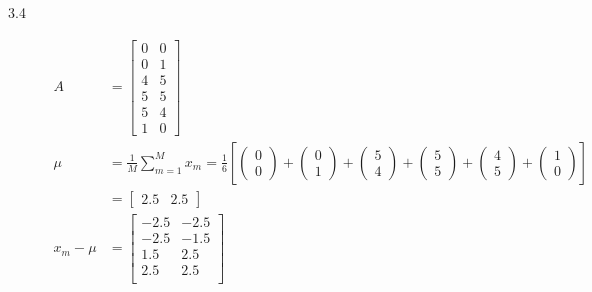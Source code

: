 \documentclass[fleqn]{article}
\begin{document}
\begin{description}
\item [3.4]
    \begin{align*}
        A &= \begin{bmatrix}
                0 & 0 \\
                0 & 1 \\
                4 & 5 \\
                5 & 5 \\
                5 & 4 \\
                1 & 0
             \end{bmatrix} \\
        \mu &= \frac{1}{M} \sum_{m=1}^{M}{x_m} = \frac{1}{6} \left [ \begin{pmatrix}0 \\ 0\end{pmatrix} +
                                                                     \begin{pmatrix}0 \\ 1\end{pmatrix} +
                                                                     \begin{pmatrix}5 \\ 4\end{pmatrix} +
                                                                     \begin{pmatrix}5 \\ 5\end{pmatrix} +
                                                                     \begin{pmatrix}4 \\ 5\end{pmatrix} +
                                                                     \begin{pmatrix}1 \\ 0\end{pmatrix} \right ] \\
            &= \begin{bmatrix} 2.5 & 2.5 \end{bmatrix} \\
        x_m - \mu &= \begin{bmatrix}
                        -2.5 & -2.5 \\
                        -2.5 & -1.5 \\
                         1.5 &  2.5 \\
                         2.5 &  2.5 \\

\end{bmatrix}
\end{align*}
\end{description}
\end{document}
